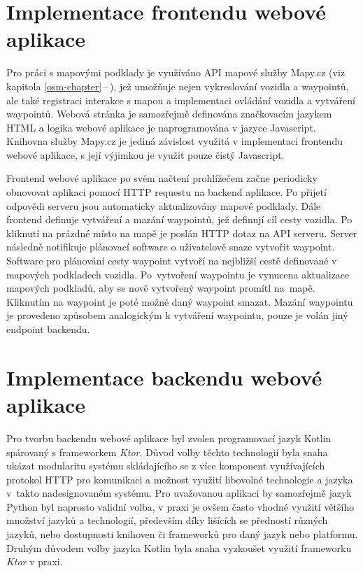 \documentclass[czech, bachelor]{diploma}
\newcommand{\peteref}[1]{\ref{#1}\,--\,\nameref{#1}}
\begin{document}
\section{Implementace frontendu webové aplikace}

Pro práci s mapovými podklady je využíváno API mapové služby Mapy.cz\cite{mapycz-source} (viz kapitola \peteref{osm-chapter}),
jež umožňuje nejen vykreslování vozidla a waypointů, ale také registraci interakce s mapou a implementaci ovládání vozidla
a vytváření waypointů. Webová stránka je samozřejmě definována značkovacím jazykem HTML a logika webové aplikace je
naprogramována v jazyce Javascript. Knihovna služby Mapy.cz je jediná závislost využitá v implementaci frontendu webové aplikace,
s její výjimkou je využit pouze čistý Javascript.

Frontend webové aplikace po svém načtení prohlížečem začne periodicky obnovovat aplikaci pomocí HTTP requestu na backend aplikace.
Po přijetí odpovědi serveru jsou automaticky aktualizovány mapové podklady. Dále frontend definuje vytváření a mazání waypointů,
jež definují cíl cesty vozidla. Po kliknutí na prázdné místo na mapě je poslán HTTP dotaz na API serveru. Server následně
notifikuje plánovací software o uživatelově snaze vytvořit waypoint. Software pro plánování cesty waypoint vytvoří na nejbližší
cestě definované v mapových podkladech vozidla. Po~vytvoření waypointu je vynucena aktualizace mapových podkladů, aby se nově
vytvořený waypoint promítl na~mapě. Kliknutím na waypoint je poté možné daný waypoint smazat. Mazání waypointu je provedeno
způsobem analogickým k vytváření waypointu, pouze je volán jiný endpoint backendu.

\section{Implementace backendu webové aplikace}

Pro tvorbu backendu webové aplikace byl zvolen programovací jazyk Kotlin spárovaný s frameworkem \emph{Ktor}\cite{ktor-source}.
Důvod volby těchto technologií byla snaha ukázat modularitu systému skládajícího se z více komponent využívajících protokol HTTP
pro komunikaci a možnost využití libovolné technologie a jazyka v~takto nadesignovaném systému. Pro uvažovanou aplikaci
by samozřejmě jazyk Python byl naprosto validní volba, v praxi je ovšem často vhodné využití většího množství jazyků a
technologií, především díky lišících se předností různých jazyků, nebo dostupnosti knihoven či frameworků pro daný jazyk nebo
platformu. Druhým důvodem volby jazyka Kotlin byla snaha vyzkoušet využití frameworku \emph{Ktor} v praxi.
\end{document}
